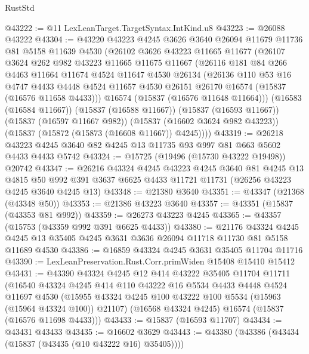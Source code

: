 \begin{lexlean}{RustStd}
\begin{coremodule}
{\begin{coremodule}
{{{{{{{{{{{{{{{{{{{{{{{{{{{{{{{{{{{{{{{{{{{{{{{{{{{{{{{{{{{{@43222 := @11 LexLeanTarget.TargetSyntax.IntKind.u8
@43223 := @26088 @43222
@43304 := @43220
    @43223
    @4245
    @3626
    @3640
    @26094
    @11679
    @11736
    @81
    @5158
    @11639
    @4530
    (@26102
      @3626
      @43223
      @11665
      @11677
      (@26107
        @3624
        @262
        @982
        @43223
        @11665
        @11675
        @11667
        (@26116
          @181
          @84
          @266
          @4463
          @11664
          @11674
          @4524
          @11647
          @4530
          @26134
          (@26136
            @110
            @53
            @16
            @4747
            @4433
            @4448
            @4524
            @11657
            @4530
            @26151
            @26170
            @16574
            (@15837 (@16576 @11658 @4433)))
          @16574
          (@15837 (@16576 @11648 @11664)))
        (@16583 (@16584 @11667))
        (@15837 (@16588 @11667))
        (@15837 (@16593 @11667))
        (@15837 (@16597 @11667 @982))
        (@15837 (@16602 @3624 @982 @43223))
        (@15837 (@15872 (@15873 (@16608 @11667)) @4245))))
@43319 := @26218 @43223 @4245 @3640 @82 @4245 @13 @11735 @93 @997 @81 @663 @5602 @4433 @4433 @5742
@43324 := @15725 (@19496 (@15730 @43222 @19498)) @20742
@43347 := @26216
    @43324
    @4245
    @43223
    @4245
    @3640
    @81
    @4245
    @13
    @4815
    @50
    @992
    @391
    @3637
    @6625
    @4433
    @11721
    @11731
    (@26256 @43223 @4245 @3640 @4245 @13)
@43348 := @21380 @3640
@43351 := @43347 (@21368 (@43348 @50))
@43353 := @21386 @43223 @3640
@43357 := @43351 (@15837 (@43353 @81 @992))
@43359 := @26273 @43223 @4245
@43365 := @43357 (@15753 (@43359 @992 @391 @6625 @4433))
@43380 := @21176
    @43324
    @4245
    @4245
    @13
    @35405
    @4245
    @3631
    @3636
    @26094
    @11718
    @11730
    @81
    @5158
    @11689
    @4530
@43386 := @16859 @43324 @4245 @3631 @35405 @11704 @11716
@43390 := LexLeanPreservation.Rust.Corr.primWiden @15408 @15410 @15412
@43431 := @43390
    @43324
    @4245
    @12
    @414
    @43222
    @35405
    @11704
    @11711
    (@16540
      @43324
      @4245
      @414
      @110
      @43222
      @16
      @5534
      @4433
      @4448
      @4524
      @11697
      @4530
      (@15955 @43324 @4245 @100 @43222 @100 @5534 (@15963 (@15964 @43324 @100)) @21107)
      (@16568 @43324 @4245)
      @16574
      (@15837 (@16576 @11698 @4433)))
@43433 := @15837 (@16593 @11707)
@43434 := @43431 @43433
@43435 := @16602 @3629
@43443 := @43380 (@43386 (@43434 (@15837 (@43435 (@10 @43222 @16) @35405))))
}}}}}}}}}}}}}}}}}}}}}}}}}}}}}}}}}}}}}}}}}}}}}}}}}}}}}}}}}}}}
\end{coremodule}}
\end{coremodule}
\end{lexlean}

